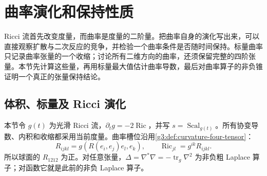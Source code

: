 
% 
% 

\section{曲率演化和保持性质}
\label{g3:sec:2703}

Ricci 流首先改变度量，而曲率是度量的二阶量。把曲率自身的演化写出来，可以直接观察扩散与二次反应的竞争，并检验一个曲率条件是否随时间保持。标量曲率只记录曲率张量的一个收缩；讨论所有二维方向的曲率，还须保留完整的四阶张量。本节先计算这些量，再用标量最大值估计曲率导数，最后对曲率算子的非负锥证明一个真正的张量保持结论。

\subsection{体积、标量及 Ricci 演化}
\label{g3:subsec:2703:01}
本节令 \(g(t)\) 为光滑 Ricci 流，\(\partial_tg=-2\operatorname{Ric}\)，并写 \(s=\operatorname{Scal}_{g(t)}\)。所有协变导数、内积和收缩都采用当前度量。曲率槽位沿用\cref{g3:def:curvature-four-tensor}：
\[
	R_{ijkl}=g(R(e_i,e_j)e_l,e_k),
	\qquad \operatorname{Ric}_{jl}=g^{ik}R_{ijkl}.
\]
所以球面的 \(R_{1212}\) 为正。对任意张量，\(\Delta=\nabla^*\nabla=-\operatorname{tr}_g\nabla^2\) 为非负粗 Laplace 算子；对函数它就是此前的非负 Laplace 算子。


